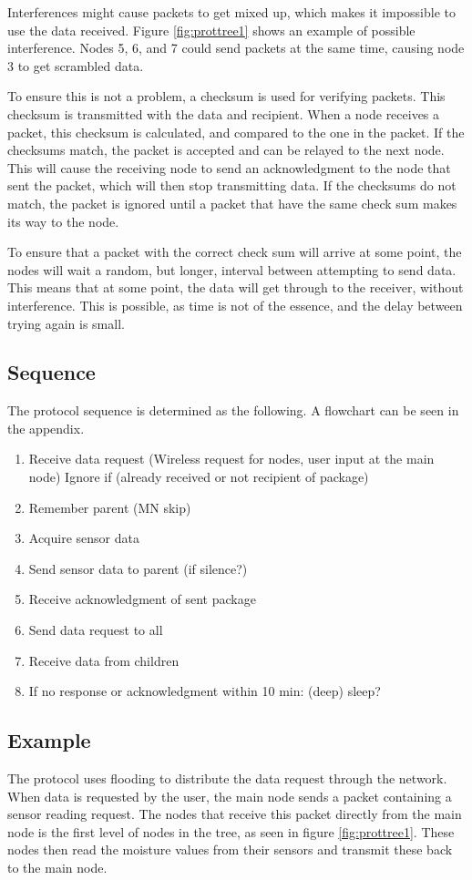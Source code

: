Interferences might cause packets to get mixed up, which makes it impossible to use the data received. Figure \ref{fig:prottree1} shows an example of possible interference. Nodes 5, 6, and 7 could send packets at the same time, causing node 3 to get scrambled data.

To ensure this is not a problem, a checksum is used for verifying packets. This checksum is transmitted with the data and recipient. When a node receives a packet, this checksum is calculated, and compared to the one in the packet. If the checksums match, the packet is accepted and can be relayed to the next node. This will cause the receiving node to send an acknowledgment to the node that sent the packet, which will then stop transmitting data.
If the checksums do not match, the packet is ignored until a packet that have the same check sum makes its way to the node.

To ensure that a packet with the correct check sum will arrive at some point, the nodes will wait a random, but longer, interval between attempting to send data. This means that at some point, the data will get through to the receiver, without interference.
This is possible, as time is not of the essence, and the delay between trying again is small.

\subsection{Sequence}
The protocol sequence is determined as the following. A flowchart can be seen in the appendix.
\begin{enumerate}
	\item Receive data request (Wireless request for nodes, user input at the main node)
		\subitem Ignore if (already received or not recipient of package)
	\item Remember parent (MN skip)
	\item Acquire sensor data
	\item Send sensor data to parent (if silence?)
	\item Receive acknowledgment of sent package
	\item Send data request to all
	\item Receive data from children
	\item If no response or acknowledgment within 10 min: (deep) sleep?
\end{enumerate}

\subsection*{Example}
The protocol uses flooding to distribute the data request through the network. 
When data is requested by the user, the main node sends a packet containing a sensor reading request. 
The nodes that receive this packet directly from the main node is the first level of nodes in the tree, as seen in figure \ref{fig:prottree1}. 
These nodes then read the moisture values from their sensors and transmit these back to the main node. 

